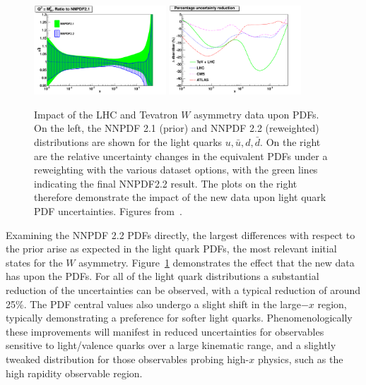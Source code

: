 \begin{figure}[hp!]
  \includegraphics[width=0.44\textwidth]{6-LHCimpact/figs/xdbar-nnpdf22.pdf}
    \includegraphics[width=0.44\textwidth]{6-LHCimpact/figs/dbar-perc.pdf}

  \caption[Impact of the LHC and Tevatron $W$ asymmetry data upon PDFs]{Impact of the LHC and Tevatron $W$ asymmetry data upon PDFs. On the left, the NNPDF 2.1 (prior) and NNPDF 2.2 (reweighted) distributions are shown for the light quarks $u,\bar{u},d,\bar{d}$. On the right are the relative uncertainty changes in the equivalent PDFs under a reweighting with the various dataset options, with the green lines indicating the final NNPDF2.2 result. The plots on the right therefore demonstrate the impact of the new data upon light quark PDF uncertainties. Figures from~\cite{Ball:2011gg}.}
 \label{fig:22pdfimpact}
\end{figure}


Examining the NNPDF 2.2 PDFs directly, the largest differences with respect to the prior arise as expected in the light quark PDFs, the most relevant initial states for the $W$ asymmetry. Figure~\ref{fig:22pdfimpact} demonstrates the effect that the new data has upon the PDFs. For all of the light quark distributions a substantial reduction of the uncertainties can be observed, with a typical reduction of around 25\%. The PDF central values also undergo a slight shift in the large$-x$ region, typically demonstrating a preference for softer light quarks. Phenomenologically these improvements will manifest in reduced uncertainties for observables sensitive to light/valence quarks over a large kinematic range, and a slightly tweaked distribution for those observables probing high-$x$ physics, such as the high rapidity observable region.

